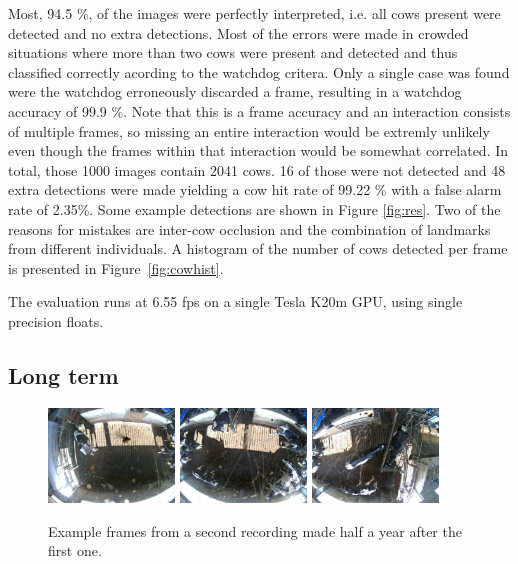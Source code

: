 \documentclass{cta-author}
\begin{document}
Most, 94.5 \%, of the images were perfectly interpreted, i.e. all cows present were detected and no extra 
detections.
Most of the errors were made in crowded situations where more than two cows were present and detected and 
thus classified correctly acording to the watchdog critera. Only a single case was found were the watchdog 
erroneously discarded a frame, resulting in a watchdog accuracy of 99.9 \%. Note that this is a frame 
accuracy and an interaction consists of multiple frames, so missing an entire interaction would be extremly 
unlikely even though the frames within that interaction would be somewhat correlated. In total, 
those 1000 images contain 2041 cows. 16 of those were not detected and 48 extra detections were made yielding 
a cow hit rate of 99.22 \% with a false alarm rate of 2.35\%. Some example detections are shown in Figure 
\ref{fig:res}.
Two of the reasons for mistakes are inter-cow occlusion and the combination of landmarks from different 
individuals. A  
histogram of the number of cows detected per frame is presented in Figure~\ref{fig:cowhist}.

The evaluation runs at 6.55 fps on a single Tesla K20m GPU, using single precision floats.

\subsection{Long term}
\begin{figure}[tb]
\begin{center}
  \includegraphics[width=0.3\textwidth]{new-2.jpg}
  \includegraphics[width=0.3\textwidth]{new-1.jpg}
  \includegraphics[width=0.3\textwidth]{new-0.jpg}
\end{center}
  \caption{Example frames from a second recording made half a year after the first one.}
  \label{fig:new}
\end{figure}
\end{document}

